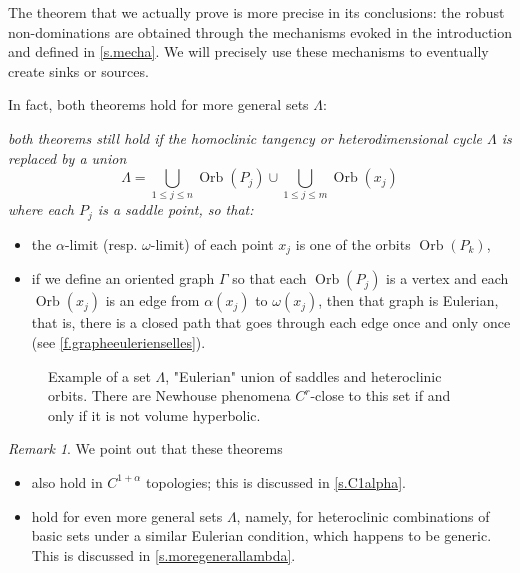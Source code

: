 \documentclass[11pt, a4paper]{amsart}
\theoremstyle{plain}
\theoremstyle{definition}
\theoremstyle{remark}
\newtheorem{remark}[proposition]{Remark}
\numberwithin{equation}{section}         %
\def\Orb{\operatorname{Orb}}
\begin{document}
The theorem that we actually prove is  more precise in its conclusions: the robust non-dominations are obtained through the mechanisms evoked in the introduction and defined in \cref{s.mecha}. 
We will precisely use these mechanisms to eventually create sinks or sources.

In fact, both theorems hold for more general sets $\Lambda$:

\medskip

{\em both theorems still hold if the homoclinic tangency or heterodimensional cycle $\Lambda$ is replaced by a union 
$$\Lambda=\bigcup_{1\leq j\leq n}\Orb(P_j) \cup \bigcup_{1\leq j\leq m}\Orb(x_j)$$
where each $P_j$ is a saddle point, so that:
\begin{itemize}
\item the $\alpha$-limit (resp. $\omega$-limit) of each point $x_j$ is one of the orbits $\Orb(P_k)$,
\item if we define an oriented graph $\Gamma$ so that each $\Orb(P_j)$ is a vertex and each $\Orb(x_j)$ is an edge from $\alpha(x_j)$ to $\omega(x_j)$, then that graph is Eulerian, that is, there is a closed path that goes through each edge once and only once (see \cref{f.grapheeulerienselles}).
\end{itemize}}


\begin{figure}[H]\label{f.grapheeulerienselles}
\begin{center}
\def\svgwidth{130pt}           %

\end{center}
\caption{\small Example of a set $\Lambda$, "Eulerian" union of saddles and heteroclinic orbits. There are Newhouse phenomena $C^r$-close to this set if and only if it is not volume hyperbolic.}
\label{f.grapheeul}
\end{figure} 





\begin{remark}
We point out that these theorems
\begin{itemize}
\item also hold in $C^{1+\alpha}$ topologies; this is discussed in \cref{s.C1alpha}.
\item hold for even more general sets $\Lambda$, namely, for heteroclinic combinations of basic sets under a similar Eulerian condition, which happens to be generic. This is discussed in \cref{s.moregenerallambda}.
\end{itemize}
\end{remark}
\end{document}
